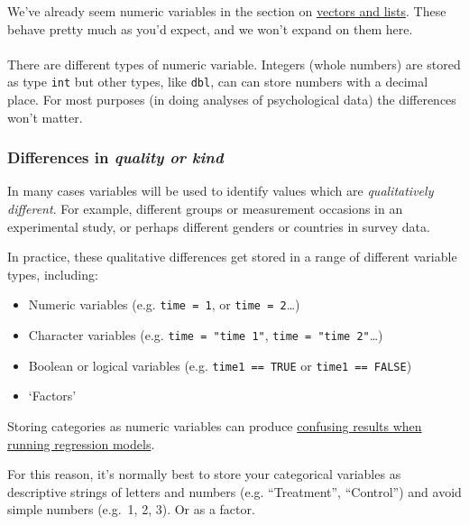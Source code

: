 \documentclass[]{article}
\providecommand{\tightlist}{%
  \setlength{\itemsep}{0pt}\setlength{\parskip}{0pt}}
\let\oldparagraph\paragraph
\renewcommand{\paragraph}[1]{\oldparagraph{#1}\mbox{}}
\begin{document}
We've already seem numeric variables in the section on \protect\hyperlink{vectors}{vectors and lists}. These behave pretty much as you'd expect, and we won't expand on them here.

\hypertarget{section-3}{%
\paragraph{}\label{section-3}}

There are different types of numeric variable. Integers (whole numbers) are stored as type \texttt{int} but other types, like \texttt{dbl}, can can store numbers with a decimal place. For most purposes (in doing analyses of psychological data) the differences won't matter.

\hypertarget{character-and-factor}{%
\subsubsection*{\texorpdfstring{Differences in \emph{quality or kind}}{Differences in quality or kind}}\label{character-and-factor}}

In many cases variables will be used to identify values which are \emph{qualitatively different}. For example, different groups or measurement occasions in an experimental study, or perhaps different genders or countries in survey data.

In practice, these qualitative differences get stored in a range of different variable types, including:

\begin{itemize}
\tightlist
\item
  Numeric variables (e.g. \texttt{time\ =\ 1}, or \texttt{time\ =\ 2}\ldots{})
\item
  Character variables (e.g. \texttt{time\ =\ "time\ 1"}, \texttt{time\ =\ "time\ 2"}\ldots{})
\item
  Boolean or logical variables (e.g. \texttt{time1\ ==\ TRUE} or \texttt{time1\ ==\ FALSE})
\item
  `Factors'
\end{itemize}

Storing categories as numeric variables can produce \protect\hyperlink{factors-vs-linear-inputs}{confusing results when running regression models}.

For this reason, it's normally best to store your categorical variables as descriptive strings of letters and numbers (e.g. ``Treatment'', ``Control'') and avoid simple numbers (e.g.~1, 2, 3). Or as a factor.
\end{document}
